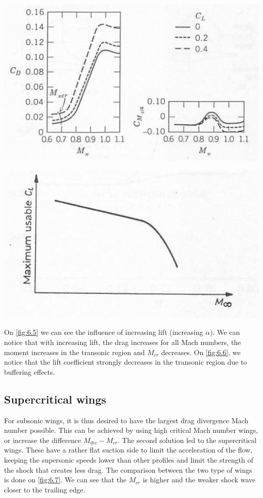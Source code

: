 	\begin{center}
	\begin{minipage}{0.4\textwidth}
	\includegraphics[scale=0.3]{ch6/5}
	\label{fig:6.5}
	\end{minipage}
	\begin{minipage}{0.4\textwidth}
	\includegraphics[scale=0.6]{ch6/6}
	\label{fig:6.6}
	\end{minipage}
	\end{center}

	On \autoref{fig:6.5} we can see the influence of increasing lift (increasing $\alpha$). We can notice that with increasing lift, the drag increases for all Mach numbers, the moment increases in the transonic region and $M_{cr}$ decreases. On \autoref{fig:6.6}, we notice that the lift coefficient strongly decreases in the transonic region due to buffering effects. 
	
\subsection{Supercritical wings}
	For subsonic wings, it is thus desired to have the largest drag divergence Mach number possible. This can be achieved by using high critical Mach number wings, or increase the difference  $M_{div} -M_{cr}$. The second solution led to the supercritical wings. These have a rather flat suction side to limit the acceleration of the flow, keeping the supersonic speeds lower than other profiles and limit the strength of the shock that creates less drag. The comparison between the two type of wings is done on \autoref{fig:6.7}. We can see that the $M_{cr}$ is higher and the weaker shock wave closer to the trailing edge. 
	
